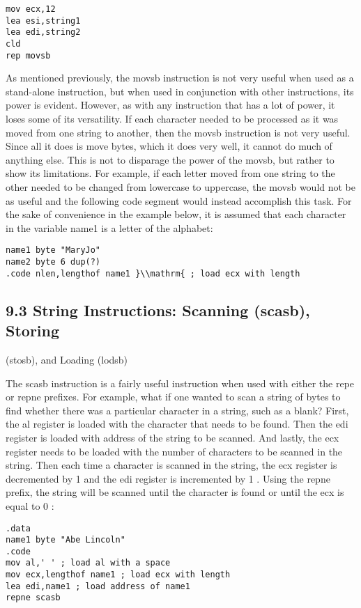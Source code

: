 \documentclass[10pt]{article}
\begin{document}
\begin{verbatim}
mov ecx,12
lea esi,string1
lea edi,string2
cld
rep movsb
\end{verbatim}

As mentioned previously, the movsb instruction is not very useful when used as a stand-alone instruction, but when used in conjunction with other instructions, its power is evident. However, as with any instruction that has a lot of power, it loses some of its versatility. If each character needed to be processed as it was moved from one string to another, then the movsb instruction is not very useful. Since all it does is move bytes, which it does very well, it cannot do much of anything else. This is not to disparage the power of the movsb, but rather to show its limitations. For example, if each letter moved from one string to the other needed to be changed from lowercase to uppercase, the movsb would not be as useful and the following code segment would instead accomplish this task. For the sake of convenience in the example below, it is assumed that each character in the variable name1 is a letter of the alphabet:

\begin{verbatim}
name1 byte "MaryJo"
name2 byte 6 dup(?)
.code nlen,lengthof name1 }\\mathrm{ ; load ecx with length 
\end{verbatim}

\subsection*{9.3 String Instructions: Scanning (scasb), Storing}
(stosb), and Loading (lodsb)

The scasb instruction is a fairly useful instruction when used with either the repe or repne prefixes. For example, what if one wanted to scan a string of bytes to find whether there was a particular character in a string, such as a blank? First, the al register is loaded with the character that needs to be found. Then the edi register is loaded with address of the string to be scanned. And lastly, the ecx register needs to be loaded with the number of characters to be scanned in the string. Then each time a character is scanned in the string, the ecx register is decremented by 1 and the edi register is incremented by 1 . Using the repne prefix, the string will be scanned until the character is found or until the ecx is equal to 0 :

\begin{verbatim}
.data
name1 byte "Abe Lincoln"
.code
mov al,' ' ; load al with a space
mov ecx,lengthof name1 ; load ecx with length
lea edi,name1 ; load address of name1
repne scasb
\end{verbatim}
\end{document}
